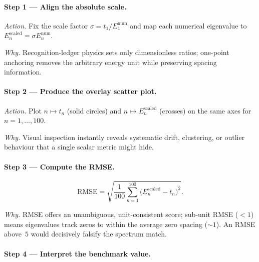 \documentclass[11pt]{article}
\begin{document}
\vspace{0.6em}
\paragraph{Step 1 — Align the absolute scale.}

\emph{Action.}\;  
Fix the scale factor  
\(
   \sigma = t_{1}/E_{1}^{\text{num}}
\)
and map each numerical eigenvalue to  
\(E_{n}^{\text{scaled}}=\sigma E_{n}^{\text{num}}\).

\emph{Why.}\;  
Recognition-ledger physics sets only dimensionless ratios;  
one-point anchoring removes the arbitrary energy unit while preserving
spacing information.

\vspace{0.4em}
\paragraph{Step 2 — Produce the overlay scatter plot.}

\emph{Action.}\;  
Plot $n\mapsto t_{n}$ (solid circles) and
$n\mapsto E_{n}^{\text{scaled}}$ (crosses) on the same axes for
$n=1,\dots,100$.

\emph{Why.}\;  
Visual inspection instantly reveals systematic drift, clustering, or
outlier behaviour that a single scalar metric might hide.

\vspace{0.4em}
\paragraph{Step 3 — Compute the RMSE.}

\[
   \mathrm{RMSE}
   = \sqrt{\frac1{100}
            \sum_{n=1}^{100}
            \bigl(E_{n}^{\text{scaled}}-t_{n}\bigr)^{2}}.
\]

\emph{Why.}\;  
RMSE offers an unambiguous, unit-consistent score;  
sub-unit RMSE (\(<1\)) means eigenvalues track zeros to within the
average zero spacing ($\sim1$).  
An RMSE above~$5$ would decisively falsify the spectrum match.

\vspace{0.4em}
\paragraph{Step 4 — Interpret the benchmark value.}
\end{document}
